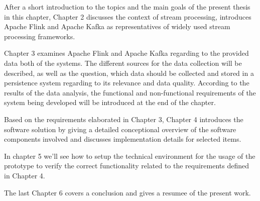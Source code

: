 After a short introduction to the topics and the main goals of the present thesis in this
chapter, Chapter 2 discusses the context of stream processing, introduces Apache Flink and
Apache Kafka as representatives of widely used stream processing frameworks.

Chapter 3 examines Apache Flink and Apache Kafka regarding to the provided data both of the systems.
The different sources for the data collection will be described, as well as the question, which data
should be collected and stored in a persistence system regarding to its relevance and data quality.
According to the results of the data analysis, the functional and non-functional requirements of the
system being developed will be introduced at the end of the chapter.

Based on the requirements elaborated in Chapter 3, Chapter 4 introduces the software solution by
giving a detailed conceptional overview of the software components involved and discusses implementation
details for selected items.

In chapter 5 we'll see how to setup the technical environment for the usage of the prototype
to verify the correct functionality related to the requirements defined in Chapter 4.

The last Chapter 6 covers a conclusion and gives a resumee of the present work.